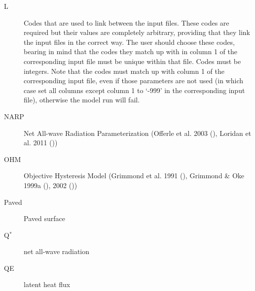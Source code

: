 \documentclass[letterpaper,10pt,english]{sphinxmanual}
\begin{document}
\begin{description}
\item[{L}] \leavevmode{}\label{\detokenize{notation:term-19}}
Codes that are used to link between the input files. These codes are required but their values are completely arbitrary, providing that they link the input files in the correct way. The user should choose these codes, bearing in mind that the codes they match up with in column 1 of the corresponding input file must be unique within that file. Codes must be integers. Note that the codes must match up with column 1 of the corresponding input file, even if those parameters are not used (in which case set all columns except column 1 to ‘-999’ in the corresponding input file), otherwise the model run will fail.

\item[{NARP}] \leavevmode{}\label{\detokenize{notation:term-narp}}
Net All-wave  Radiation   Parameterization (Offerle et al. 2003 \label{\detokenize{notation:id3}}{\hyperref[\detokenize{references:o2003}]{\sphinxcrossref{{[}O2003{]}}}} (), Loridan et al. 2011 \label{\detokenize{notation:id4}}{\hyperref[\detokenize{references:l2011}]{\sphinxcrossref{{[}L2011{]}}}} ())

\item[{OHM}] \leavevmode{}\label{\detokenize{notation:term-ohm}}
Objective Hysteresis Model (Grimmond et al. 1991 \label{\detokenize{notation:id5}}{\hyperref[\detokenize{references:g91ohm}]{\sphinxcrossref{{[}G91OHM{]}}}} (), Grimmond \& Oke 1999a \label{\detokenize{notation:id6}}{\hyperref[\detokenize{references:go99qs}]{\sphinxcrossref{{[}GO99QS{]}}}} (), 2002 \label{\detokenize{notation:id7}}{\hyperref[\detokenize{references:go2002}]{\sphinxcrossref{{[}GO2002{]}}}} ())

\item[{Paved}] \leavevmode{}\label{\detokenize{notation:term-paved}}
Paved surface

\item[{Q$^{\text{*}}$}] \leavevmode{}\label{\detokenize{notation:term-qstar}}
net all-wave radiation

\item[{QE}] \leavevmode{}\label{\detokenize{notation:term-qe}}
latent heat flux


\end{description}
\end{document}
